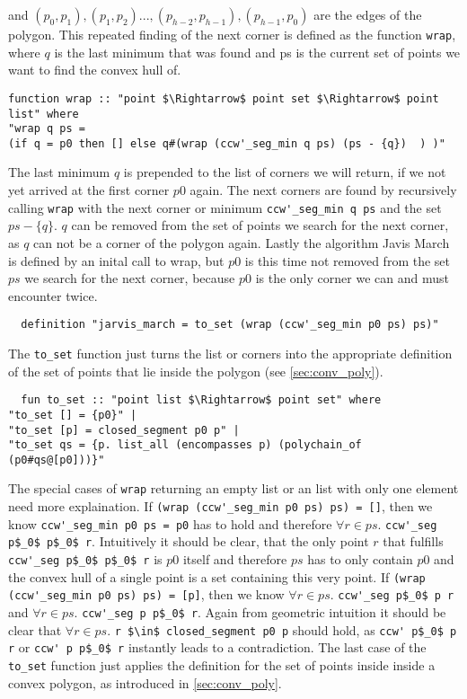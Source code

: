 and $(p_0,p_1),(p_1,p_2) ... ,(p_{h-2},p_{h-1}), (p_{h-1},p_0)$ are the edges of the polygon.
This repeated finding of the next corner is defined as the function \lstinline|wrap|, where
$q$ is the last minimum that was found and ps is the current set of points we want to find
the convex hull of.
\begin{lstlisting}
function wrap :: "point $\Rightarrow$ point set $\Rightarrow$ point list" where
"wrap q ps =  
(if q = p0 then [] else q#(wrap (ccw'_seg_min q ps) (ps - {q})  ) )"
\end{lstlisting}
The last minimum $q$ is prepended to the list of corners we will return, if we not yet arrived
at the first corner $p0$ again. The next corners are found by  recursively calling \lstinline|wrap|
with the next corner or minimum \lstinline|ccw'_seg_min q ps| and the set $ps - \{q\}$. $q$ can be
removed from the set of points we search for the next corner, as $q$ can not be a corner
of the polygon again.
Lastly the algorithm Javis March is defined by an inital call to wrap, but $p0$ is this time
not removed from the set $ps$ we search for the next corner, because $p0$ is the only corner we
can and must encounter twice.
\begin{lstlisting}
  definition "jarvis_march = to_set (wrap (ccw'_seg_min p0 ps) ps)"
\end{lstlisting}  
The \lstinline|to_set| function just turns the list or corners into the appropriate 
definition of the set of points that lie inside the polygon (see \ref{sec:conv_poly}).  
\begin{lstlisting}
  fun to_set :: "point list $\Rightarrow$ point set" where
"to_set [] = {p0}" |
"to_set [p] = closed_segment p0 p" |
"to_set qs = {p. list_all (encompasses p) (polychain_of (p0#qs@[p0]))}" 
\end{lstlisting}
The special cases of \lstinline|wrap| returning an empty list or an list with only one element
need more explaination. If \lstinline|(wrap (ccw'_seg_min p0 ps) ps) = []|, then we know
\lstinline|ccw'_seg_min p0 ps = p0| has to hold and therefore $\forall r \in ps.$ \lstinline|ccw'_seg p$_0$ p$_0$ r|.
Intuitively it should be clear, that the only point $r$ that fulfills \lstinline|ccw'_seg p$_0$ p$_0$ r| is $p0$ itself
and therefore $ps$ has to only contain $p0$ and the convex hull of a single point is a set containing this
very point. If \lstinline|(wrap (ccw'_seg_min p0 ps) ps) = [p]|, then we know 
$\forall r \in ps.$ \lstinline|ccw'_seg p$_0$ p r| and $\forall r \in ps.$ \lstinline|ccw'_seg p p$_0$ r|.
Again from geometric intuition it should be clear that  $\forall r \in ps.$ \lstinline|r $\in$ closed_segment p0 p|
should hold, as \lstinline|ccw' p$_0$ p r| or \lstinline|ccw' p p$_0$ r| instantly leads to a contradiction.
The last case of the \lstinline|to_set| function just applies the definition for the 
set of points inside inside a convex polygon, as introduced in \ref*{sec:conv_poly}. 
